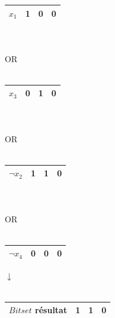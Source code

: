 	\begin{center}
		\begin{minipage}{0.5\textwidth}
			\centering
			\begin{tabular}{| c| c| c|c|}
				\hline
				$x_{1}$& 1 & 0 & 0 \\\hline
			\end{tabular}
		\end{minipage}
		\\~\\
		OR
		\\~\\
		\begin{minipage}{0.5\textwidth}
			\centering
			\begin{tabular}{|c | c| c| c|}
				\hline
				$x_{3}$& 0 & 1 & 0 \\\hline
			\end{tabular}
		\end{minipage}
		\\~\\
		OR
		\\~\\
		\begin{minipage}{0.5\textwidth}
			\centering
			\begin{tabular}{| c| c| c|c|}
				\hline
				$\neg x_{2}$& 1 & 1 & 0 \\\hline
			\end{tabular}
		\end{minipage}
		\\~\\
		OR
		\\~\\
		\begin{minipage}{0.5\textwidth}
			\centering
			\begin{tabular}{|c | c| c| c|}
				\hline
				$\neg x_{4}$& 0 & 0 & 0 \\\hline
			\end{tabular}
		\end{minipage}
		\begin{center}
			
			$\downarrow$
			\\~\\
			\begin{tabular}{|c | c| c| c|}
				\hline
				$Bitset$ résultat& 1 & 1 & 0 \\\hline
			\end{tabular}
		\end{center}
	\end{center}
	
